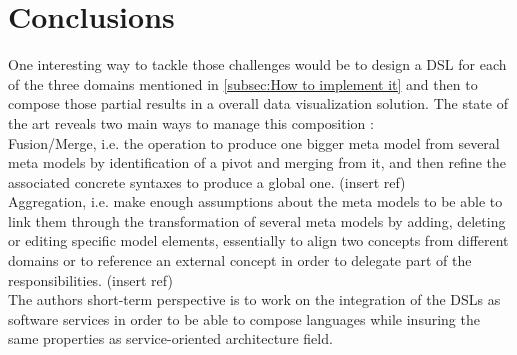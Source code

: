 \documentclass{acm_proc_article-sp}
\begin{document}

\section{Conclusions}


One interesting way to tackle those challenges would be to design a
DSL for each of the three domains mentioned in \ref{subsec:How to
  implement it} and then to compose those partial results in a overall
data visualization solution.
The state of the art reveals two main ways to manage this composition :\\
 Fusion/Merge, i.e. the operation to produce one bigger meta
model from several meta models by identification of a pivot and
merging from it, and
then refine the associated concrete syntaxes to produce a global one. (insert ref)\\
 Aggregation, i.e. make enough assumptions about the meta models to be able to link them through the transformation of several meta models by adding, deleting or editing specific model elements, essentially to align two concepts from different domains or to reference an external concept in order to delegate part of the responsibilities. (insert ref)\\
The authors short-term perspective is to work on the integration of
the DSLs as software services in order to be able to compose languages
while insuring the same properties as service-oriented architecture
field.




%
\end{document}

